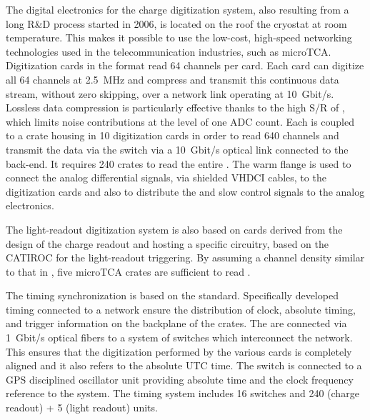 The digital electronics for the charge digitization system, also resulting from a long R\&D process started in 2006, is located %
on the roof the cryostat at room temperature. This makes it possible to use the low-cost, high-speed  networking technologies used in the telecommunication industries, such as microTCA. 
Digitization cards in the  format read \num{64} channels per card. Each  card can digitize all  \num{64} channels at \SI{2.5}{MHz} and compress and transmit this continuous data stream, without zero skipping, over a network link operating at \SI{10}{Gbit/s}. Lossless data compression is particularly effective thanks to the high S/R of \dual{}, which limits noise contributions at the level of one ADC count. Each  is coupled to a  crate housing in \num{10}  digitization cards in order to read  \num{640} channels and transmit the data via the  switch via a \SI{10}{Gbit/s} optical link connected to the  back-end. It requires \num{240}  crates to read the entire . The  warm flange is used to connect the analog differential signals, via shielded VHDCI cables, to the  digitization cards and also to distribute the  and slow control signals to the analog  electronics.  

The light-readout digitization system is also based on   cards derived from the design of the charge readout and hosting a specific circuitry, based on the CATIROC  for the light-readout triggering. By assuming a  channel density similar to that in , five microTCA crates are sufficient to read \dpnumpmtch {}.

The timing synchronization is based on the  standard. Specifically developed timing  connected to a  network ensure the distribution of clock, absolute timing, and trigger information on the backplane of the  crates. The  are connected via \SI{1}{Gbit/s} optical fibers to a system of  switches which interconnect the  network. This ensures that the digitization performed by the various  cards is completely aligned and it also refers to the absolute UTC time. 
The  switch is connected to a GPS disciplined oscillator unit providing absolute time and the clock frequency reference to the system. The timing system includes \num{16}  switches and \num{240} (charge readout) + \num{5} (light readout)  units.    

